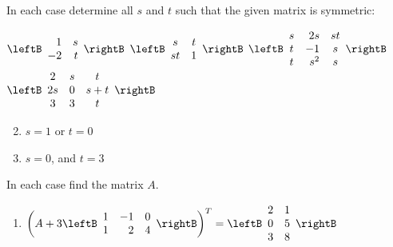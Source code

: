 \begin{multicols}{2}
\begin{ex}
\begin{sol}
\begin{enumerate}[label={\alph*.}]
\end{enumerate}
\end{sol}
\end{ex}

\begin{ex}
In each case determine all $s$ and $t$ such that the given matrix is symmetric:
\begin{exenumerate}
\exitem 
$\leftB \begin{array}{rr}
1 & s \\
-2 & t
\end{array} \rightB$
\exitem 
$\leftB \begin{array}{cc}
s & t \\
st & 1
\end{array} \rightB$
\exitem 
$\leftB \begin{array}{crc}
s & 2s & st \\
t & -1 & s \\
t & s^{2} & s
\end{array} \rightB$
\exitem 
$\leftB \begin{array}{ccc}
2 & s & t \\
2s & 0 & s + t \\
3 & 3 & t
\end{array} \rightB$
\end{exenumerate}
\begin{sol}
\begin{enumerate}[label={\alph*.}]
\setcounter{enumi}{1}
\item  $s = 1$ or $t = 0$

\setcounter{enumi}{3}
\item  $s = 0$, and $t = 3$

\end{enumerate}
\end{sol}
\end{ex}

\begin{ex}
In each case find the matrix $A$.


\begin{enumerate}[label={\alph*.}]
\item 
$\left(A + 3 \leftB \begin{array}{rrr}
1 & -1 & 0 \\
1 & 2 & 4
\end{array} \rightB \right)^{T} = \leftB \begin{array}{rr}
2 & 1 \\
0 & 5 \\
3 & 8
\end{array} \rightB$


\end{enumerate}
\end{ex}
\end{multicols}
